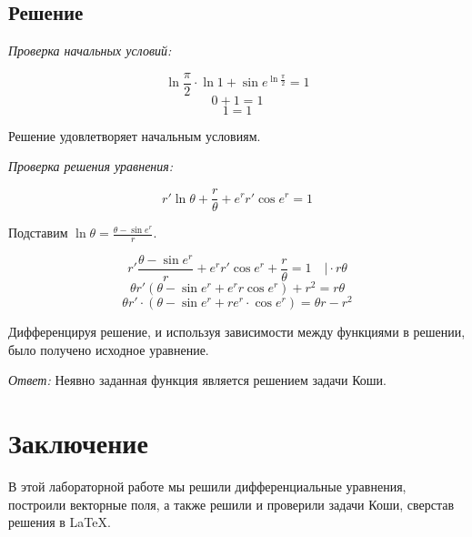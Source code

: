 \documentclass[14pt, a4paper, titlepage, fleqn]{extarticle}
\begin{document}
        \subsection{Решение}
            
        \textit{Проверка начальных условий:}

            \[ \ln{\frac{\pi}{2}} \cdot \ln{1} + \sin{e^{\ln{\frac{\pi}{2}}}} = 1 \]
            \[ 0 + 1 = 1 \]
            \[ 1 = 1 \]

        Решение удовлетворяет начальным условиям.

        \textit{Проверка решения уравнения:}

            \[ r' \ln{\theta} + \frac{r}{\theta} +  e^r r'\cos{e^r} = 1 \]

        Подставим
        \( 
            \displaystyle  
            \ln{\theta} = \frac{\theta - \sin{e^r}}{r}
        \).

        \[ 
            r' \frac{\theta - \sin{e^r}}{r} +  e^r r'\cos{e^r} + \frac{r}{\theta} = 1 
            \quad \vert \cdot r \theta
        \]
        \[ \theta r' \left( \theta - \sin{e^r} + e^r r \cos{e^r} \right) + r^2 = r \theta \]
        \[ \theta r' \cdot \left( \theta - \sin{e^r} + r e^r \cdot \cos{e^r} \right) = \theta r - r^2 \]
    
        Дифференцируя решение, и используя зависимости между функциями в решении,
        было получено исходное уравнение.

        \textit{Ответ:} Неявно заданная функция является решением задачи Коши.
    \pagebreak

    \section{Заключение}
        В этой лабораторной работе мы решили дифференциальные
        уравнения, построили векторные поля, а также решили и проверили задачи Коши,
        сверстав решения в \LaTeX.
\end{document}
